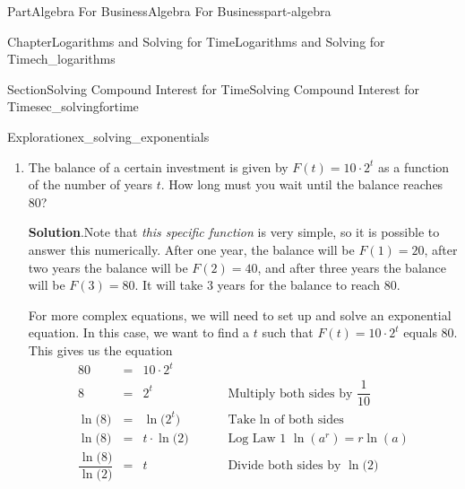 \documentclass[oneside,10pt,]{tufte-book}
\newcommand{\blocktitlefont}{\relax}
\numberwithin{equation}{chapter}
\newcommand{\amp}{&}
\begin{document}
\begin{partptx}{Part}{Algebra For Business}{}{Algebra For Business}{}{}{part-algebra}
\begin{chapterptx}{Chapter}{Logarithms and Solving for Time}{}{Logarithms and Solving for Time}{}{}{ch_logarithms}
\begin{sectionptx}{Section}{Solving Compound Interest for Time}{}{Solving Compound Interest for Time}{}{}{sec_solvingfortime}
\begin{exploration}{Exploration}{}{ex_solving_exponentials}
\begin{enumerate}[font=\bfseries,label=(\alph*),ref=\alph*]
\begin{descriptionlist}
\begin{dlimedium}{Brute Force}{ex_solving_exponentials-2-2-1-1-2}
\begin{equation*}
\end{equation*}
Now we can use Law Log 1 \(\ln(a^r) = r\cdot \ln(a)\) with \(a=1.95\) and \(r=2x\) to get%
\begin{equation*}
\ln\Big( { 4}\Big) + 2x\cdot \ln\Big({ (1.95)} \Big) = \ln\Big(16\Big)
\end{equation*}
You can simplify this using a calculator to get%
\begin{equation*}
{1.386\dots} + 2\cdot x\cdot 0.667\dots = 2.772\dots
\end{equation*}
You can solve this as usual to get%
\begin{equation*}
x = \dfrac{{2.772\dots} - 1.386\dots}{2\cdot 0.667\dots} = 1.038\dots
\end{equation*}
Alternatively, you can solve the exact equation to get%
\begin{equation*}
x = \dfrac{\ln(16) - \ln(4)}{2\cdot \ln(1.95)}
\end{equation*}
%
\end{dlimedium}%
\end{descriptionlist}
%
\item{}The balance of a certain investment is given by \(F(t) = 10\cdot 2^t\) as a function of the number of years \(t\). How long must you wait until the balance reaches 80?%
\par\smallskip%
\noindent\textbf{\blocktitlefont Solution}.\hypertarget{ex_solving_exponentials-3-2}{}\quad{}Note that \emph{this specific function} is very simple, so it is possible to answer this numerically.  After one year, the balance will be \(F(1) = 20\), after two years the balance will be \(F(2)=40\), and after three years the balance will be \(F(3)=80\).   It will take 3 years for the balance to reach \(80\).%
\par
For more complex equations, we will need to set up and solve an exponential equation.  In this case, we want to find a \(t\) such that \(F(t) = 10 \cdot 2^t\) equals 80. This gives us the equation%
\begin{align*}
80 \amp=\amp 10 \cdot 2^t \amp \\
8 \amp=\amp 2^t \amp \qquad\text{ Multiply both sides by }\dfrac{1}{10}\\
\ln\Big(8\Big) \amp=\amp \ln\Big(2^t\Big) \amp  \qquad\text{ Take }\ln\text{ of both sides}\\
\ln\Big(8\Big) \amp=\amp t\cdot \ln\Big(2\Big) \amp \qquad\text{ Log Law 1 } \ln(a^r)=r\ln(a)\\
\dfrac{\ln\Big(8\Big)}{\ln\Big(2\Big)} \amp=\amp t  \amp \qquad\text{ Divide both sides by } \ln\Big(2\Big)

\end{align*}
\end{enumerate}
\end{exploration}
\end{sectionptx}
\end{chapterptx}
\end{partptx}
\end{document}
